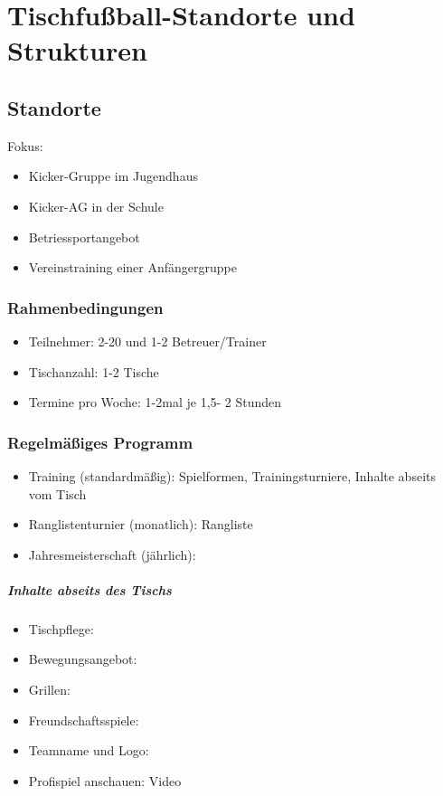 \chapter{Tischfußball-Standorte und Strukturen}

\section{Standorte}

Fokus:
\begin{itemize}
\item Kicker-Gruppe im Jugendhaus
\item Kicker-AG in der Schule
\item Betriessportangebot
\item Vereinstraining einer Anfängergruppe  
\end{itemize}

\subsection{Rahmenbedingungen}

\begin{itemize}
\item Teilnehmer: 2-20 und 1-2 Betreuer/Trainer
\item Tischanzahl: 1-2 Tische
\item Termine pro Woche: 1-2mal je 1,5- 2 Stunden
\end{itemize}

\subsection{Regelmäßiges Programm}

\begin{itemize}
\item Training (standardmäßig): Spielformen, Trainingsturniere, Inhalte abseits vom Tisch   
\item Ranglistenturnier (monatlich): 
Rangliste  
\item Jahresmeisterschaft (jährlich):
\end{itemize}  

\paragraph{Inhalte abseits des Tischs}
\begin{itemize}
\item Tischpflege:  
\item Bewegungsangebot: 
\item Grillen:
\item Freundschaftsspiele:
\item Teamname und Logo:
\item Profispiel anschauen: Video 
\end{itemize} 

